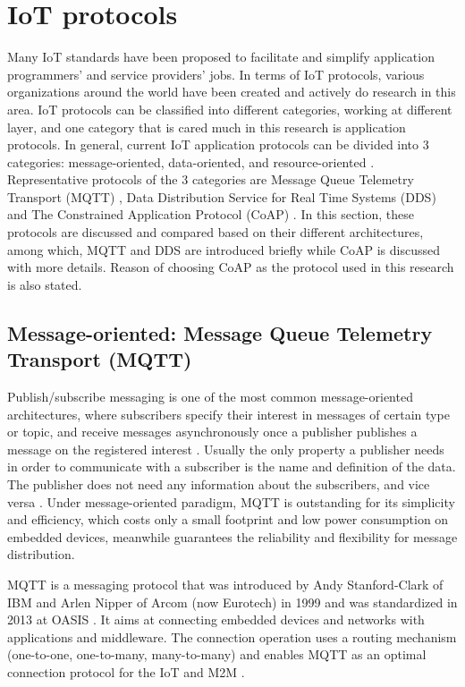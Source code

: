 \section{IoT protocols} \label{IoT_protocols}

Many IoT standards have been proposed to facilitate and simplify application programmers' and service providers' jobs. In terms of IoT protocols, various organizations around the world have been created and actively do research in this area. IoT protocols can be classified into different categories, working at different layer, and one category that is cared much in this research is application protocols. In general, current IoT application protocols can be divided into 3 categories: message-oriented, data-oriented, and resource-oriented \cite{7396558}. Representative protocols of the 3 categories are Message Queue Telemetry Transport (MQTT) \cite{mqtt_protocol}, Data Distribution Service for Real Time Systems (DDS) \cite{dds} and The Constrained Application Protocol (CoAP) \cite{coap_protocol}. In this section, these protocols are discussed and compared based on their different architectures, among which, MQTT and DDS are introduced briefly while CoAP is discussed with more details. Reason of choosing CoAP as the protocol used in this research is also stated. 

\subsection{Message-oriented:  Message Queue Telemetry Transport (MQTT)}
Publish/subscribe messaging is one of the most common message-oriented architectures, where subscribers specify their interest in messages of certain type or topic, and receive messages asynchronously once a publisher publishes a message on the registered interest \cite{6918928}. Usually the only property a publisher needs in order to communicate with a subscriber is the name and definition of the data. The publisher does not need any information about the subscribers, and vice versa \cite{pardo2005introduction}. Under message-oriented paradigm, MQTT is outstanding for its simplicity and efficiency, which costs only a small footprint and low power consumption on embedded devices, meanwhile guarantees the reliability and flexibility for message distribution.

MQTT is a messaging protocol that was introduced by Andy Stanford-Clark of IBM and Arlen Nipper of Arcom (now Eurotech) in 1999 and was standardized in 2013 at OASIS \cite{mqtt_protocol}. It aims at connecting embedded devices and networks with applications and middleware. The connection operation uses a routing mechanism (one-to-one, one-to-many, many-to-many) and enables MQTT as an optimal connection protocol for the IoT and M2M \cite{7123563}. 

